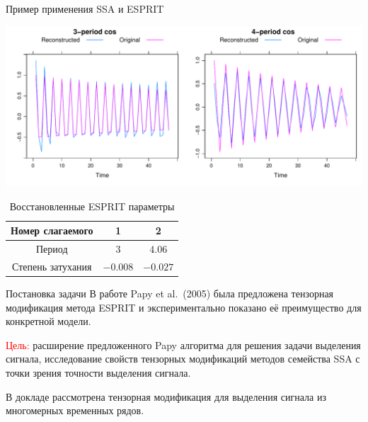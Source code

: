 \documentclass[ucs, notheorems, handout]{beamer}
\newcommand{\bluetext}[1]{{\usebeamercolor[fg]{bluetext_color}#1}}
\begin{document}
    \begin{frame}{Пример применения SSA и ESPRIT}
        \begin{center}
            \includegraphics[width=\textwidth]{img/rec}
        \end{center}
        \begin{table}
            \caption{Восстановленные ESPRIT параметры}
            \begin{tabular}{|c|c|c|}
                \hline
                Номер слагаемого  & 1         & 2        \\ \hline
                Период            & $3$       & $4.06$   \\ \hline
                Степень затухания & $ -0.008$ & $-0.027$ \\ \hline
            \end{tabular}
        \end{table}

    \end{frame}

    \begin{frame}{Постановка задачи}
        В работе Papy et al.\ (2005) была предложена тензорная модификация метода ESPRIT и экспериментально показано её
        преимущество для конкретной модели.

        \medskip

        \textcolor{red}{Цель:} расширение предложенного Papy алгоритма для решения задачи выделения сигнала,
        исследование свойств тензорных модификаций методов семейства SSA с точки зрения
        точности выделения сигнала.

        \smallskip

        В докладе рассмотрена тензорная модификация для выделения сигнала из многомерных временных рядов.
    \end{frame}
\end{document}
